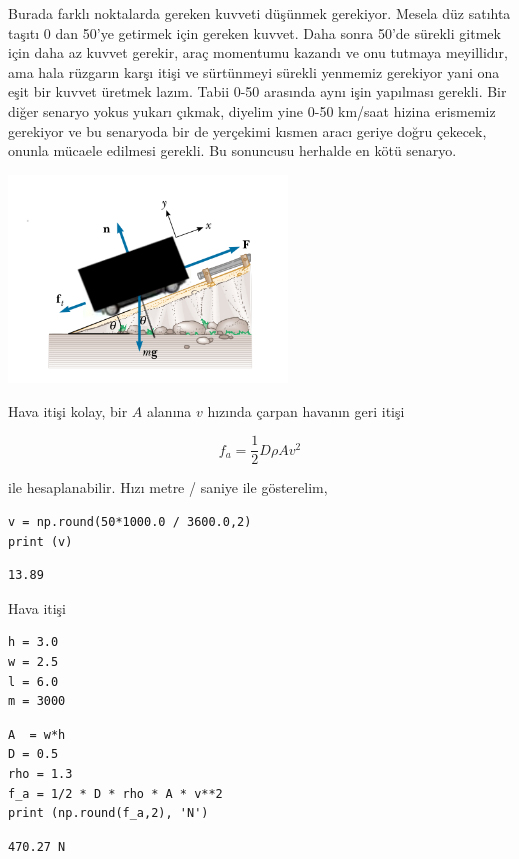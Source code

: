 \documentclass[12pt,fleqn]{article}\usepackage{../../common}
\begin{document}
Burada farklı noktalarda gereken kuvveti düşünmek gerekiyor. Mesela düz satıhta
taşıtı 0 dan 50'ye getirmek için gereken kuvvet. Daha sonra 50'de sürekli gitmek
için daha az kuvvet gerekir, araç momentumu kazandı ve onu tutmaya meyillidır,
ama hala rüzgarın karşı itişi ve sürtünmeyi sürekli yenmemiz gerekiyor yani ona
eşit bir kuvvet üretmek lazım. Tabii 0-50 arasında aynı işin yapılması
gerekli. Bir diğer senaryo yokus yukarı çıkmak, diyelim yine 0-50 km/saat hizina
erismemiz gerekiyor ve bu senaryoda bir de yerçekimi kısmen aracı geriye doğru
çekecek, onunla mücaele edilmesi gerekli. Bu sonuncusu herhalde en kötü senaryo.

\includegraphics[width=20em]{phy_005_basics_07.png}

Hava itişi kolay, bir $A$ alanına $v$ hızında çarpan havanın geri itişi

$$
f_a = \frac{1}{2} D \rho A v^2
$$

ile hesaplanabilir. Hızı metre / saniye ile gösterelim,

\begin{verbatim}
v = np.round(50*1000.0 / 3600.0,2)
print (v)
\end{verbatim}

\begin{verbatim}
13.89
\end{verbatim}

Hava itişi

\begin{verbatim}
h = 3.0
w = 2.5
l = 6.0
m = 3000
\end{verbatim}

\begin{verbatim}
A  = w*h
D = 0.5
rho = 1.3
f_a = 1/2 * D * rho * A * v**2
print (np.round(f_a,2), 'N')
\end{verbatim}

\begin{verbatim}
470.27 N
\end{verbatim}
\end{document}
